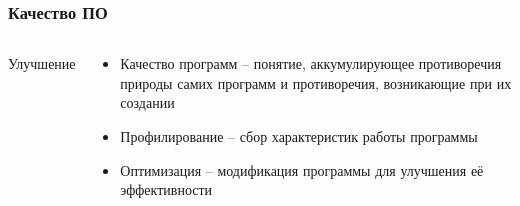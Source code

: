 \documentclass[10pt]{beamer}
\begin{document}

\begin{frame}
\frametitle{Качество ПО}

\begin{columns}[c]

\begin{center}
  Улучшение
\end{center}

\begin{block}{}
\begin{itemize}
  \item Качество программ -- понятие, аккумулирующее противоречия природы самих программ и противоречия, возникающие при их создании
  \item Профилирование -- сбор характеристик работы программы
  \item Оптимизация -- модификация программы для улучшения её эффективности
\end{itemize}
\end{block}

\end{columns}


\end{frame}
\end{document}
